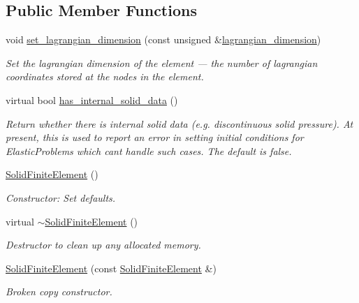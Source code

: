 \subsection*{Public Member Functions}
\begin{DoxyCompactItemize}
\item 
void \hyperlink{classoomph_1_1SolidFiniteElement_afae461c6679212165a47829662d0274d}{set\+\_\+lagrangian\+\_\+dimension} (const unsigned \&\hyperlink{classoomph_1_1SolidFiniteElement_a0200f8dd7b61eea84d7921e78bfbb5f9}{lagrangian\+\_\+dimension})
\begin{DoxyCompactList}\small\item\em Set the lagrangian dimension of the element --- the number of lagrangian coordinates stored at the nodes in the element. \end{DoxyCompactList}\item 
virtual bool \hyperlink{classoomph_1_1SolidFiniteElement_aa68837a8f6d1cb021d5cae9c2968a6f3}{has\+\_\+internal\+\_\+solid\+\_\+data} ()
\begin{DoxyCompactList}\small\item\em Return whether there is internal solid data (e.\+g. discontinuous solid pressure). At present, this is used to report an error in setting initial conditions for Elastic\+Problems which can\textquotesingle{}t handle such cases. The default is false. \end{DoxyCompactList}\item 
\hyperlink{classoomph_1_1SolidFiniteElement_aa66c3834f1bf99bb821453a2bfbb55c9}{Solid\+Finite\+Element} ()
\begin{DoxyCompactList}\small\item\em Constructor\+: Set defaults. \end{DoxyCompactList}\item 
virtual \hyperlink{classoomph_1_1SolidFiniteElement_adc8527ae26aba090bed52da41f41b57f}{$\sim$\+Solid\+Finite\+Element} ()
\begin{DoxyCompactList}\small\item\em Destructor to clean up any allocated memory. \end{DoxyCompactList}\item 
\hyperlink{classoomph_1_1SolidFiniteElement_a3a6e7767ca41273a053b0f4a229eb97c}{Solid\+Finite\+Element} (const \hyperlink{classoomph_1_1SolidFiniteElement}{Solid\+Finite\+Element} \&)
\begin{DoxyCompactList}\small\item\em Broken copy constructor. \end{DoxyCompactList}\item 

\end{DoxyCompactItemize}
